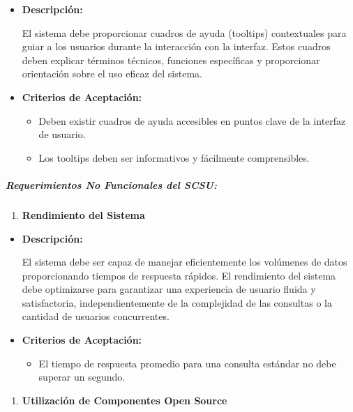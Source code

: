 \documentclass[
  12pt,
  openany]{book}
\providecommand{\tightlist}{%
  \setlength{\itemsep}{0pt}\setlength{\parskip}{0pt}}
\begin{document}
\begin{itemize}
\item
  \textbf{Descripción:}

  El sistema debe proporcionar cuadros de ayuda (tooltips) contextuales para guiar a los usuarios durante la interacción con la interfaz. Estos cuadros deben explicar términos técnicos, funciones específicas y proporcionar orientación sobre el uso eficaz del sistema.
\item
  \textbf{Criterios de Aceptación:}

  \begin{itemize}
  \item
    Deben existir cuadros de ayuda accesibles en puntos clave de la interfaz de usuario.
  \item
    Los tooltips deben ser informativos y fácilmente comprensibles.
  \end{itemize}
\end{itemize}

\hypertarget{requerimientos-no-funcionales-del-scsu}{%
\subparagraph{\texorpdfstring{\textbf{Requerimientos No Funcionales del SCSU:}}{Requerimientos No Funcionales del SCSU:}}\label{requerimientos-no-funcionales-del-scsu}}

\begin{enumerate}
\def\labelenumi{\arabic{enumi}.}
\tightlist
\item
  \textbf{Rendimiento del Sistema}
\end{enumerate}

\begin{itemize}
\item
  \textbf{Descripción:}

  El sistema debe ser capaz de manejar eficientemente los volúmenes de datos proporcionando tiempos de respuesta rápidos. El rendimiento del sistema debe optimizarse para garantizar una experiencia de usuario fluida y satisfactoria, independientemente de la complejidad de las consultas o la cantidad de usuarios concurrentes.
\item
  \textbf{Criterios de Aceptación:}

  \begin{itemize}
  \tightlist
  \item
    El tiempo de respuesta promedio para una consulta estándar no debe superar un segundo.
  \end{itemize}
\end{itemize}

\begin{enumerate}
\def\labelenumi{\arabic{enumi}.}
\setcounter{enumi}{1}
\tightlist
\item
  \textbf{Utilización de Componentes Open Source}
\end{enumerate}
\end{document}

